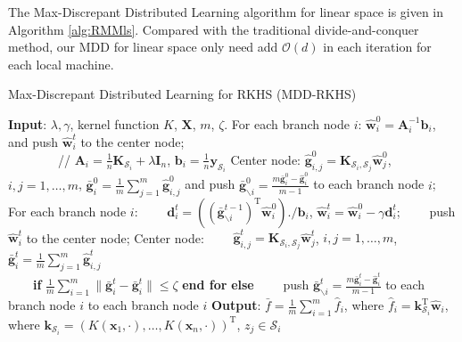 \documentclass{article}
\begin{document}
The Max-Discrepant Distributed Learning  algorithm for linear space is given in Algorithm \ref{alg:RMMls}.
Compared with the traditional divide-and-conquer method,
our MDD for linear space only need add $\mathcal{O}(d)$ in each iteration for each local machine.
\begin{algorithm}
    \caption{Max-Discrepant Distributed Learning for RKHS (MDD-RKHS)}
    \label{alg:RMMRKHS}
    \begin{algorithmic}[1]
    \STATE \textbf{Input}: $\lambda,\gamma$, kernel function $K$, $\mathbf X$, $m$, $\zeta$.
     \STATE For each branch node $i$: $\hat{\mathbf w}_i^0=\mathbf A_i^{-1} \mathbf b_i$, and push $\hat{\mathbf w}_i^t$ to the center node;\\
            ~~~~~~~~// $\mathbf A_i=\frac{1}{n}\mathbf K_{\mathcal{S}_i}+
            \lambda \mathbf I_n$, $\mathbf b_i= \frac{1}{n}\mathbf y_{\mathcal{S}_i}$
    \STATE Center node: $\hat{\mathbf g}_{i,j}^0=\mathbf K_{\mathcal{S}_i,\mathcal{S}_j}\hat{\mathbf w}_j^0$, $i, j=1,\ldots,m$,
     $\bar{\mathbf g}_{i}^0=\frac{1}{m}\sum_{j=1}^m \hat{\mathbf g}_{i,j}^0$
     and push  $\bar{\mathbf g}^{0}_{\backslash i}=\frac{m\bar{\mathbf g}_i^{0}-\hat{\mathbf g}_i^0}{m-1}$ to each branch node $i$;
    \STATE  For each branch node $i$:
    \STATE ~~~~$\mathbf d_i^t=\left(\left(\bar{\mathbf g}^{t-1}_{\backslash i}\right)^\mathrm{T}\hat{\mathbf w}_i^0\right)./\mathbf b_i$,
     $\hat{\mathbf w}_i^t=\hat{\mathbf w}_i^0-\gamma\mathbf d_i^t$;
    \STATE ~~~~push $\hat{\mathbf w}_i^t$ to the center node;
     \STATE Center node:
     \STATE ~~~~$\hat{\mathbf g}_{i,j}^{t}=\mathbf K_{\mathcal{S}_i,\mathcal{S}_j}\hat{\mathbf w}_j^t$, $i, j=1,\ldots,m$,
     $\bar{\mathbf g}_{i}^t=\frac{1}{m}\sum_{j=1}^m \hat{\mathbf g}_{i,j}^t$\\
      ~~~~\textbf{if} {$\frac{1}{m}\sum_{i=1}^m\|\bar{\mathbf g}_i^{t}-\bar{\mathbf g}_i^{t}\|\leq \zeta$} \textbf{end for}
      \STATE \textbf{else}
      \STATE ~~~~push $\bar{\mathbf g}^{t}_{\backslash i}=\frac{m\bar{\mathbf g}_i^{t}-\hat{\mathbf g}_i^t}{m-1}$ to each branch node $i$ to each branch node $i$
    \ENDFOR
    \STATE \textbf{Output}: $\bar{f}=\frac{1}{m}\sum_{i=1}^m\hat{f}_i$, where $\hat{f}_i=\mathbf k_{\mathcal{S}_i}^\mathrm{T}\hat{\mathbf w}_i$,
    where $\mathbf k_{\mathcal{S}_i}=(K(\mathbf x_1,\cdot),\ldots,K(\mathbf x_n,\cdot))^\mathrm{T}$, $z_j\in\mathcal{S}_i$
    \end{algorithmic}
\end{algorithm}
\end{document}
